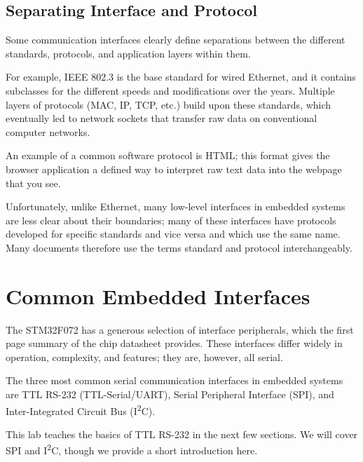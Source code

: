 \documentclass[openany,11pt,fleqn]{book} %
\begin{document}
\subsection{Separating Interface and Protocol}
   
Some communication interfaces clearly define separations between the different standards, protocols, and application layers within them. 

For example, IEEE 802.3 is the base standard for wired Ethernet, and it contains subclasses for the different speeds and modifications over the years. Multiple layers of protocols (MAC, IP, TCP, etc.) build upon these standards, which eventually led to network sockets that transfer raw data on conventional computer networks. 

An example of a common software protocol is HTML; this format gives the browser application a defined way to interpret raw text data into the webpage that you see. 

Unfortunately, unlike Ethernet, many low-level interfaces in embedded systems are less clear about their boundaries; many of these interfaces have protocols developed for specific standards and vice versa and which use the same name. Many documents therefore use the terms standard and protocol interchangeably. 
 

\section{Common Embedded Interfaces}
The STM32F072 has a generous selection of interface peripherals, which the first page summary of the chip datasheet provides. These interfaces differ widely in operation, complexity, and features; they are, however, all serial. 

The three most common serial communication interfaces in embedded systems are TTL RS-232 (TTL-Serial/UART), Serial Peripheral Interface (SPI), and Inter-Integrated Circuit Bus (I\textsuperscript{2}C). 

This lab teaches the basics of TTL RS-232 in the next few sections. We will cover SPI and I\textsuperscript{2}C, though we provide a short introduction here. 
\end{document}
